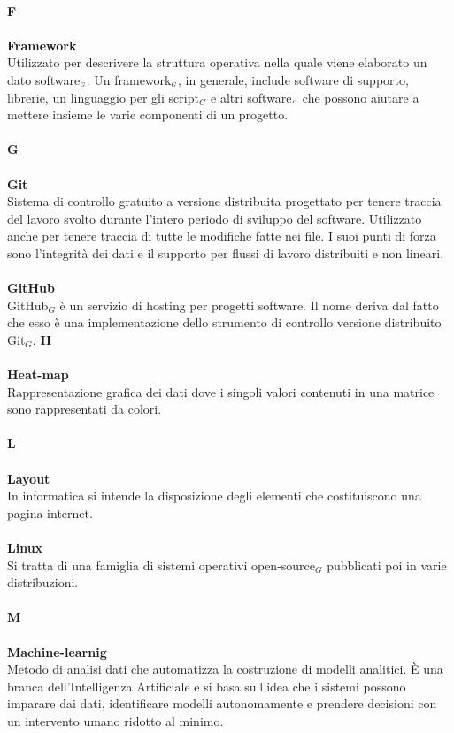 \\
\textbf{F} \\
\\
\textbf{Framework}\\
Utilizzato per descrivere la struttura operativa nella quale viene elaborato un dato software$_{\scaleto{G}{3pt}}$.
Un framework$_{\scaleto{G}{3pt}}$, in generale, include software di supporto, librerie, un linguaggio per gli script$_G$ e altri software$_{\scaleto{G}{3pt}}$ che possono aiutare a mettere insieme le varie componenti di un progetto.\\
\\
\textbf{G}\\
\\
\textbf{Git}\\
Sistema di controllo gratuito a versione distribuita progettato per tenere traccia del lavoro svolto durante l'intero periodo di sviluppo del software.
Utilizzato anche per tenere traccia di tutte le modifiche fatte nei file.
I suoi punti di forza sono l'integrità dei dati e il supporto per flussi di lavoro distribuiti e non lineari.\\
\\
\textbf{GitHub}\\
GitHub$_G$ è un servizio di hosting per progetti software. Il nome deriva dal fatto che esso è una implementazione dello strumento di controllo versione distribuito Git$_G$.
\textbf{H}\\
\\
\textbf{Heat-map}\\
Rappresentazione grafica dei dati dove i singoli valori contenuti in una matrice sono rappresentati da colori.\\
\\
\textbf{L}\\
\\
\textbf{Layout}\\
In informatica si intende la disposizione degli elementi che costituiscono una pagina internet.\\
\\
\textbf{Linux}\\
Si tratta di una famiglia di sistemi operativi open-source$_G$ pubblicati poi in varie distribuzioni.\\
\\
\textbf{M}\\
\\
\textbf{Machine-learnig}\\
Metodo di analisi dati che automatizza la costruzione di modelli analitici. È una branca dell'Intelligenza Artificiale e si basa sull'idea che i sistemi possono imparare dai dati, identificare modelli autonomamente e prendere decisioni con un intervento umano ridotto al minimo.\\

